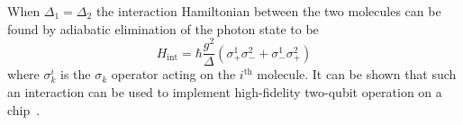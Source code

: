 When $\Delta_1 = \Delta_2$ the interaction Hamiltonian between the two
molecules can be found by adiabatic elimination of the photon state to
be~\cite{Andre2006}
%
\begin{equation}
  H_\text{int} = \hbar \frac{g^2}{\Delta} (\sigma_+^1\sigma_-^2 +
  \sigma_-^1\sigma_+^2)
\end{equation}
%
where $\sigma^i_k$ is the $\sigma_k$ operator acting on the
$i^\text{th}$ molecule. It can be shown that such an interaction can be used to
implement high-fidelity two-qubit operation on a chip~\cite{Andre2006}.


